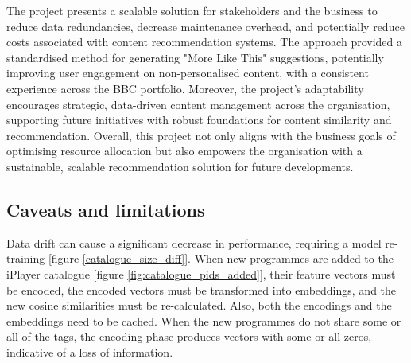 The project presents a scalable solution for stakeholders and the business to reduce data redundancies,
decrease maintenance overhead, and potentially reduce costs associated with content recommendation systems.
The approach provided a standardised method for generating "More Like This" suggestions,
potentially improving user engagement on non-personalised content,
with a consistent experience across the BBC portfolio.
Moreover, the project's adaptability encourages strategic, data-driven content management across the organisation,
supporting future initiatives with robust foundations for content similarity and recommendation.
Overall, this project not only aligns with the business goals of optimising resource allocation but also empowers the organisation with a sustainable,
scalable recommendation solution for future developments.

\subsection{Caveats and limitations}

Data drift can cause a significant decrease in performance, requiring a model re-training [figure \ref{catalogue_size_diff}].
When new programmes are added to the iPlayer catalogue [figure \ref{fig:catalogue_pids_added}], their feature vectors must be encoded,
the encoded vectors must be transformed into embeddings, and the new cosine similarities must be re-calculated.
Also, both the encodings and the embeddings need to be cached.
When the new programmes do not share some or all of the tags, the encoding phase produces vectors with some or all zeros,
indicative of a loss of information.
